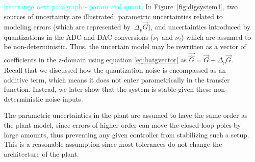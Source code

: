 \documentclass[final]{sig-alternate-05-2015}
\newcommand{\blue}[1]{{\color{blue}#1}}
\newcommand{\red}[1]{{\color{red}#1}}
\begin{document}
%
\textcolor{cyan}{[rearrange next paragraph - param and quant]}
In Figure~\ref{fig:digsystem1}, two sources of uncertainty are illustrated:
parametric uncertainties related to modeling errors  
(which are represented by~$\Delta_p \vec{G}$),  
and uncertainties introduced by quantizations in the ADC and
DAC conversions ($\nu_1$ and $\nu_2$) which are assumed to be non-deterministic.
Thus, the uncertain model may be rewritten as a vector of coefficients in the 
z-domain using equation \eqref{eq:hatgvector} as  
%
$\vec{\hat{G}}=\vec{G}+\Delta_p \vec{G}$. 
%
Recall that we discussed how the quantization noise is encompassed as an additive term, 
which means it does not enter parametrically in the transfer function. 
Instead, we later show that the system is stable given these non-deterministic noise inputs. 

The parametric uncertainties in the plant are assumed to have the same
order as the plant model, since 
errors of higher order can move the closed-loop poles by large amounts, 
thus preventing any given controller from stabilizing such a setup. 
This is a reasonable assumption since most tolerances do not change the 
architecture of the plant. 

\end{document}
